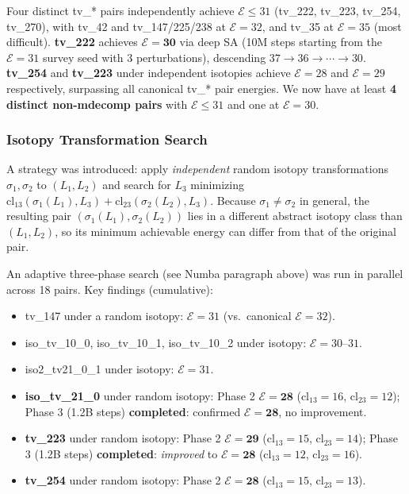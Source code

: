 \documentclass[11pt,a4paper]{article}
\theoremstyle{remark}
\newcommand{\cl}{\mathrm{cl}}
\newcommand{\E}{\mathcal{E}}
\begin{document}
Four distinct tv\_* pairs independently achieve $\E \leq 31$ (tv\_222, tv\_223, tv\_254, tv\_270),
with tv\_42 and tv\_147/225/238 at $\E=32$, and tv\_35 at $\E=35$ (most difficult).
\textbf{tv\_222} achieves $\E=\mathbf{30}$ via deep SA (10M steps starting from the
$\E=31$ survey seed with 3 perturbations), descending $37 \to 36 \to \cdots \to 30$.
\textbf{tv\_254} and \textbf{tv\_223} under independent isotopies achieve $\E=28$ and $\E=29$
respectively, surpassing all canonical tv\_* pair energies.
We now have at least \textbf{4 distinct non-mdecomp pairs} with $\E \leq 31$ and one at $\E=30$.

\subsubsection{Isotopy Transformation Search}

A strategy was introduced: apply \emph{independent} random isotopy transformations
$\sigma_1, \sigma_2$ to $(L_1, L_2)$ and search for $L_3$ minimizing
$\cl_{13}(\sigma_1(L_1), L_3) + \cl_{23}(\sigma_2(L_2), L_3)$.
Because $\sigma_1 \neq \sigma_2$ in general, the resulting pair $(\sigma_1(L_1), \sigma_2(L_2))$
lies in a different abstract isotopy class than $(L_1, L_2)$, so its minimum achievable energy
can differ from that of the original pair.

An adaptive three-phase search (see Numba paragraph above) was run in parallel across 18 pairs.
Key findings (cumulative):
\begin{itemize}
  \item tv\_147 under a random isotopy: $\E=31$ (vs.\ canonical $\E=32$).
  \item iso\_tv\_10\_0, iso\_tv\_10\_1, iso\_tv\_10\_2 under isotopy: $\E=30$--$31$.
  \item iso2\_tv21\_0\_1 under isotopy: $\E=31$.
  \item \textbf{iso\_tv\_21\_0} under random isotopy: Phase 2 $\E=\mathbf{28}$ ($\cl_{13}=16$, $\cl_{23}=12$);
    Phase 3 (1.2B steps) \textbf{completed}: confirmed $\E=\mathbf{28}$, no improvement.
  \item \textbf{tv\_223} under random isotopy: Phase 2 $\E=\mathbf{29}$ ($\cl_{13}=15$, $\cl_{23}=14$);
    Phase 3 (1.2B steps) \textbf{completed}: \emph{improved} to $\E=\mathbf{28}$ ($\cl_{13}=12$, $\cl_{23}=16$).
  \item \textbf{tv\_254} under random isotopy: Phase 2 $\E=\mathbf{28}$ ($\cl_{13}=15$, $\cl_{23}=13$).
\end{itemize}
\end{document}
